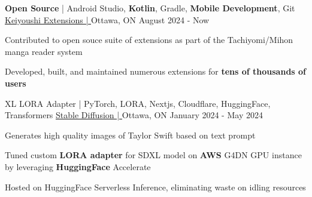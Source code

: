 \begin{cventries}
	\cventry
	{\textbf{Open Source} | Android Studio, \textbf{Kotlin}, Gradle, \textbf{Mobile Development}, Git}
	{\underline{\href{https://github.com/keiyoushi/extensions-source}{Keiyoushi Extensions | \ExternalLink}}}
	{Ottawa, ON} %
	{August 2024 - Now} %
	{
		\begin{cvitems} %
			\item {Contributed to open souce suite of extensions as part of the Tachiyomi/Mihon manga reader system}
      \item {Developed, built, and maintained numerous extensions for \textbf{tens of thousands of users}}
		\end{cvitems}
	}


	\cventry
	{XL LORA Adapter | PyTorch, LORA, Nextjs, Cloudflare, HuggingFace, Transformers}
	{\underline{\href{https://lefan.ca/projects/stable-diffusion}{Stable Diffusion | \ExternalLink}}} %
	{Ottawa, ON} %
	{January 2024 - May 2024} %
	{
		\begin{cvitems} %
			\item {Generates high quality images of Taylor Swift based on text prompt}
			\item {Tuned custom \textbf{LORA adapter} for SDXL model on \textbf{AWS} G4DN GPU instance by leveraging \textbf{HuggingFace} Accelerate}
			\item {Hosted on HuggingFace Serverless Inference, eliminating waste on idling resources}
		\end{cvitems}
	}


\end{cventries}
